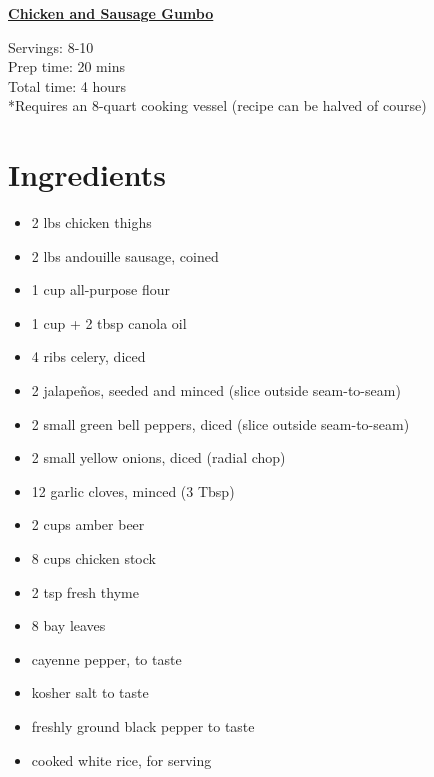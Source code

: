 \documentclass[11pt]{article}
\begin{document}
	\begin{center}\begin{huge}\underline{\textbf{Chicken and Sausage Gumbo}}\end{huge}\end{center}
	
	Servings: 8-10\\
	Prep time: 20 mins\\
	Total time: 4 hours\\
	
	*Requires an 8-quart cooking vessel (recipe can be halved of course)

	\section*{Ingredients}
	\begin{itemize}
		\item 2 lbs chicken thighs
		\item 2 lbs andouille sausage, coined
		\item 1 cup all-purpose flour
		\item 1 cup + 2 tbsp canola oil
		\item 4 ribs celery, diced
		\item 2 jalape\~nos, seeded and minced (slice outside seam-to-seam)
		\item 2 small green bell peppers, diced (slice outside seam-to-seam)
		\item 2 small yellow onions, diced (radial chop)
		\item 12 garlic cloves, minced (3 Tbsp)
		\item 2 cups amber beer
		\item 8 cups chicken stock
		\item 2 tsp fresh thyme
		\item 8 bay leaves
		\item cayenne pepper, to taste
		\item kosher salt to taste
		\item freshly ground black pepper to taste
		\item cooked white rice, for serving
	\end{itemize}
	
\end{document}
